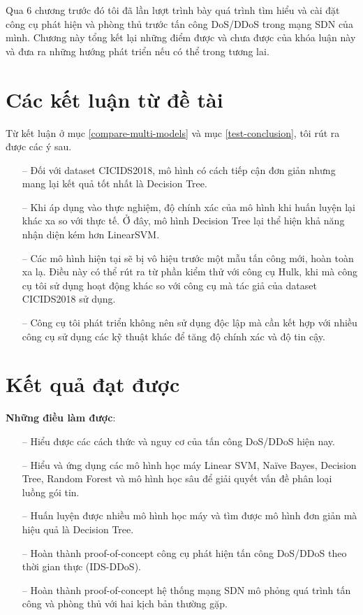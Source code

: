 Qua 6 chương trước đó tôi đã lần lượt trình bày quá trình tìm hiểu và cài đặt công cụ phát hiện và phòng thủ trước tấn công DoS/DDoS trong mạng SDN của mình. Chương này tổng kết lại những điểm được và chưa được của khóa luận này và đưa ra những hướng phát triển nếu có thể trong tương lai.

\section{Các kết luận từ đề tài}

Từ kết luận ở mục \ref{compare-multi-models} và mục \ref{test-conclusion},  tôi rút ra  được các ý sau.

\begin{itemize}
	\item [--] Đối với dataset CICIDS2018, mô hình có cách tiếp cận đơn giản nhưng  mang lại kết quả tốt nhất là Decision Tree.
	\item [--] Khi áp dụng vào thực nghiệm, độ chính xác của mô hình khi huấn luyện lại khác xa so với thực tế. Ở đây, mô hình Decision Tree lại thể hiện khả năng nhận diện kém hơn LinearSVM.
	\item [--] Các mô hình hiện tại sẽ bị vô hiệu trước một mẫu tấn công mới, hoàn toàn xa lạ. Điều này có thể  rút ra từ phần kiểm thử với công cụ Hulk, khi mà công cụ tôi sử dụng hoạt động khác so với công cụ mà tác giả của dataset CICIDS2018 sử dụng.
	\item [--] Công cụ tôi phát triển không nên sử dụng độc lập mà cần kết hợp với nhiều công cụ sử dụng các kỹ thuật khác để tăng độ chính xác và độ tin cậy.
\end{itemize}

\section{Kết quả đạt được}

\textbf{Những điều làm được}:

\begin{itemize}
	\item [--] Hiểu được các cách thức và nguy cơ của tấn công DoS/DDoS hiện nay.
	\item [--] Hiểu và ứng dụng các mô hình học máy Linear SVM, Naïve Bayes, Decision Tree, Random Forest và mô hình học sâu để giải quyết vấn đề phân loại luồng gói tin.
	\item [--] Huấn luyện được  nhiều  mô hình học máy và tìm được mô hình đơn giản mà hiệu quả là Decision Tree.
	\item [--] Hoàn thành proof-of-concept công cụ phát hiện tấn công DoS/DDoS  theo thời gian thực (IDS-DDoS).
	\item [--] Hoàn thành proof-of-concept hệ thống mạng SDN mô phỏng quá trình tấn công và phòng thủ với hai kịch bản thường gặp.
\end{itemize}

